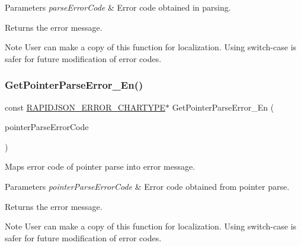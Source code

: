 \begin{DoxyParams}{Parameters}
{\em parse\+Error\+Code} & Error code obtained in parsing. \\
\hline
\end{DoxyParams}
\begin{DoxyReturn}{Returns}
the error message. 
\end{DoxyReturn}
\begin{DoxyNote}{Note}
User can make a copy of this function for localization. Using switch-\/case is safer for future modification of error codes. 
\end{DoxyNote}
\mbox{\label{group__RAPIDJSON__ERRORS_gab0c2320924fc7f2cdca02a4ce104fd8e}} 
\subsubsection{\texorpdfstring{Get\+Pointer\+Parse\+Error\+\_\+\+En()}{GetPointerParseError\_En()}}
{\footnotesize\ttfamily const \hyperlink{group__RAPIDJSON__ERRORS_ga7e4636fd48d0148f102b8a13f0539d8c}{R\+A\+P\+I\+D\+J\+S\+O\+N\+\_\+\+E\+R\+R\+O\+R\+\_\+\+C\+H\+A\+R\+T\+Y\+PE}$\ast$ Get\+Pointer\+Parse\+Error\+\_\+\+En (\begin{DoxyParamCaption}\item[{\hyperlink{group__RAPIDJSON__ERRORS_gacb2e274f33e54d91b96e9883a99a98be}{Pointer\+Parse\+Error\+Code}}]{pointer\+Parse\+Error\+Code }\end{DoxyParamCaption})\hspace{0.3cm}{\ttfamily [inline]}}



Maps error code of pointer parse into error message. 


\begin{DoxyParams}{Parameters}
{\em pointer\+Parse\+Error\+Code} & Error code obtained from pointer parse. \\
\hline
\end{DoxyParams}
\begin{DoxyReturn}{Returns}
the error message. 
\end{DoxyReturn}
\begin{DoxyNote}{Note}
User can make a copy of this function for localization. Using switch-\/case is safer for future modification of error codes. 
\end{DoxyNote}
\mbox{\label{group__RAPIDJSON__ERRORS_ga14d079416a08527108f622b197061540}} 
